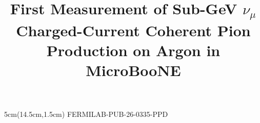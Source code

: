 \documentclass[aps,prl,reprint,superscriptaddress,nofootinbib, showpacs]{revtex4-2}
\begin{document}
\begin{textblock*}{5cm}(14.5cm,1.5cm)
\raggedleft\small FERMILAB-PUB-26-0335-PPD
\end{textblock*}


\title{First Measurement of Sub-GeV $\nu_{\mu}$ Charged-Current Coherent Pion Production on Argon in MicroBooNE}%


\newcommand{\ANL}{Argonne National Laboratory (ANL), Lemont, IL 60439, USA}
\newcommand{\Bern}{Universit\"{a}t Bern, Bern CH-3012, Switzerland}
\newcommand{\BNL}{Brookhaven National Laboratory (BNL), Upton, NY 11973, USA}
\newcommand{\UCSB}{University of California, Santa Barbara, CA 93106, USA}
\newcommand{\Cambridge}{University of Cambridge, Cambridge CB3 0HE, United Kingdom}
\newcommand{\CIEMAT}{Centro de Investigaciones Energ\'{e}ticas, Medioambientales y Tecnol\'{o}gicas (CIEMAT), Madrid E-28040, Spain}
\newcommand{\Chicago}{University of Chicago, Chicago, IL 60637, USA}
\newcommand{\Cincinnati}{University of Cincinnati, Cincinnati, OH 45221, USA}
\newcommand{\CSU}{Colorado State University, Fort Collins, CO 80523, USA}
\newcommand{\Columbia}{Columbia University, New York, NY 10027, USA}
\newcommand{\Edinburgh}{University of Edinburgh, Edinburgh EH9 3FD, United Kingdom}
\newcommand{\FNAL}{Fermi National Accelerator Laboratory (FNAL), Batavia, IL 60510, USA}
\newcommand{\Granada}{Universidad de Granada, Granada E-18071, Spain}
\newcommand{\IIT}{Illinois Institute of Technology (IIT), Chicago, IL 60616, USA}
\newcommand{\ICL}{Imperial College London, London SW7 2AZ, United Kingdom}
\newcommand{\Indiana}{Indiana University, Bloomington, IN 47405, USA}
\newcommand{\Kansas}{The University of Kansas, Lawrence, KS 66045, USA}
\newcommand{\KSU}{Kansas State University (KSU), Manhattan, KS 66506, USA}
\newcommand{\Lancaster}{Lancaster University, Lancaster LA1 4YW, United Kingdom}
\newcommand{\LANL}{Los Alamos National Laboratory (LANL), Los Alamos, NM 87545, USA}
\newcommand{\Louisiana}{Louisiana State University, Baton Rouge, LA 70803, USA}
\newcommand{\Manchester}{The University of Manchester, Manchester M13 9PL, United Kingdom}
\newcommand{\MIT}{Massachusetts Institute of Technology (MIT), Cambridge, MA 02139, USA}
\newcommand{\Michigan}{University of Michigan, Ann Arbor, MI 48109, USA}
\newcommand{\MSU}{Michigan State University, East Lansing, MI 48824, USA}
\newcommand{\Minnesota}{University of Minnesota, Minneapolis, MN 55455, USA}
\newcommand{\Nankai}{Nankai University, Nankai District, Tianjin 300071, China}
\newcommand{\NMSU}{New Mexico State University (NMSU), Las Cruces, NM 88003, USA}
\end{document}
